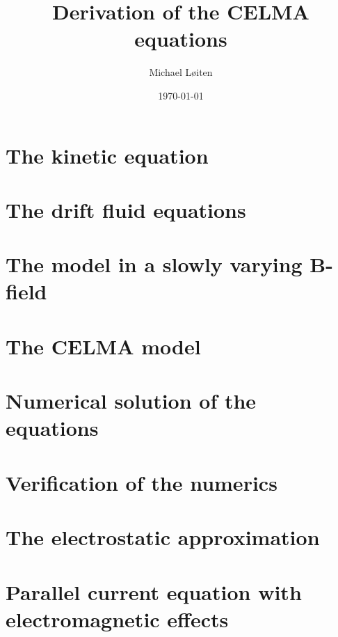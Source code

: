 \documentclass[12pt,a4paper,oneside,openright]{report} %
\title{\vspace{-8ex}Derivation of the CELMA equations\vspace{-1ex}}
\author{Michael L{\o}iten}
\date{\vspace{-2ex}\today}
\begin{document}
\maketitle
%
\chapter{The kinetic equation}

%
\chapter{The drift fluid equations}
\label{chap:drift-order}


\chapter{The model in a slowly varying B-field}


\chapter{The CELMA model}







\chapter{Numerical solution of the equations}


\chapter{Verification of the numerics}
\label{app:verification}


\appendix

\chapter{The electrostatic approximation}
\label{app:elstat}


\chapter{Parallel current equation with electromagnetic effects}
\label{app:elmag}

\end{document}
